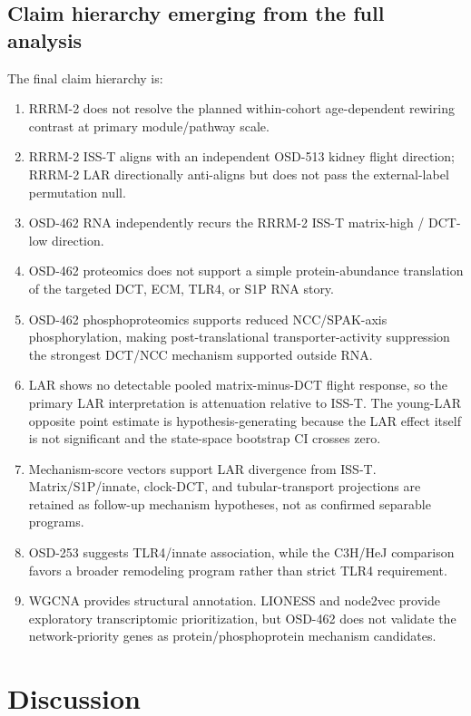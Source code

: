 \documentclass[11pt]{article}
\begin{document}
\subsection{Claim hierarchy emerging from the full analysis}

The final claim hierarchy is:
\begin{enumerate}
  \item RRRM-2 does not resolve the planned within-cohort age-dependent rewiring contrast at primary module/pathway scale.
  \item RRRM-2 ISS-T aligns with an independent OSD-513 kidney flight direction; RRRM-2 LAR directionally anti-aligns but does not pass the external-label permutation null.
  \item OSD-462 RNA independently recurs the RRRM-2 ISS-T matrix-high / DCT-low direction.
  \item OSD-462 proteomics does not support a simple protein-abundance translation of the targeted DCT, ECM, TLR4, or S1P RNA story.
  \item OSD-462 phosphoproteomics supports reduced NCC/SPAK-axis phosphorylation, making post-translational transporter-activity suppression the strongest DCT/NCC mechanism supported outside RNA.
  \item LAR shows no detectable pooled matrix-minus-DCT flight response, so the primary LAR interpretation is attenuation relative to ISS-T. The young-LAR opposite point estimate is hypothesis-generating because the LAR effect itself is not significant and the state-space bootstrap CI crosses zero.
  \item Mechanism-score vectors support LAR divergence from ISS-T. Matrix/S1P/innate, clock-DCT, and tubular-transport projections are retained as follow-up mechanism hypotheses, not as confirmed separable programs.
  \item OSD-253 suggests TLR4/innate association, while the C3H/HeJ comparison favors a broader remodeling program rather than strict TLR4 requirement.
  \item WGCNA provides structural annotation. LIONESS and node2vec provide exploratory transcriptomic prioritization, but OSD-462 does not validate the network-priority genes as protein/phosphoprotein mechanism candidates.
\end{enumerate}

\section{Discussion}
\end{document}
